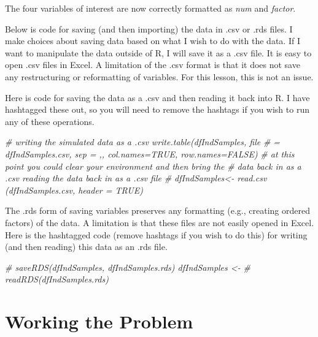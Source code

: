 \documentclass[
  11pt,
]{book}
\newenvironment{Shaded}{\begin{snugshade}}{\end{snugshade}}
\newcommand{\CommentTok}[1]{\textcolor[rgb]{0.56,0.35,0.01}{\textit{#1}}}
\begin{document}
The four variables of interest are now correctly formatted as \emph{num} and \emph{factor}.

Below is code for saving (and then importing) the data in .csv or .rds files. I make choices about saving data based on what I wish to do with the data. If I want to manipulate the data outside of R, I will save it as a .csv file. It is easy to open .csv files in Excel. A limitation of the .csv format is that it does not save any restructuring or reformatting of variables. For this lesson, this is not an issue.

Here is code for saving the data as a .csv and then reading it back into R. I have hashtagged these out, so you will need to remove the hashtags if you wish to run any of these operations.

\begin{Shaded}
\begin{Highlighting}[]
\CommentTok{\# writing the simulated data as a .csv write.table(dfIndSamples, file}
\CommentTok{\# = \textquotesingle{}dfIndSamples.csv\textquotesingle{}, sep = \textquotesingle{},\textquotesingle{}, col.names=TRUE, row.names=FALSE)}
\CommentTok{\# at this point you could clear your environment and then bring the}
\CommentTok{\# data back in as a .csv reading the data back in as a .csv file}
\CommentTok{\# dfIndSamples\textless{}{-} read.csv (\textquotesingle{}dfIndSamples.csv\textquotesingle{}, header = TRUE)}
\end{Highlighting}
\end{Shaded}

The .rds form of saving variables preserves any formatting (e.g., creating ordered factors) of the data. A limitation is that these files are not easily opened in Excel. Here is the hashtagged code (remove hashtags if you wish to do this) for writing (and then reading) this data as an .rds file.

\begin{Shaded}
\begin{Highlighting}[]
\CommentTok{\# saveRDS(dfIndSamples, \textquotesingle{}dfIndSamples.rds\textquotesingle{}) dfIndSamples \textless{}{-}}
\CommentTok{\# readRDS(\textquotesingle{}dfIndSamples.rds\textquotesingle{})}
\end{Highlighting}
\end{Shaded}

\hypertarget{working-the-problem-1}{%
\section{Working the Problem}\label{working-the-problem-1}}
\end{document}
